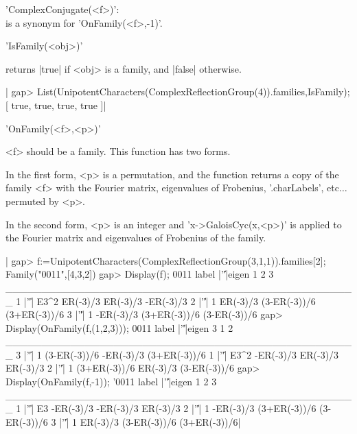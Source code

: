 'ComplexConjugate(<f>)':\\   is    a    synonym    for 'OnFamily(<f>,-1)'.


'IsFamily(<obj>)'

returns |true| if <obj> is a family, and |false| otherwise.

|    gap> List(UnipotentCharacters(ComplexReflectionGroup(4)).families,IsFamily);
    [ true, true, true, true ]|


'OnFamily(<f>,<p>)'

<f> should be a family. This function has two forms.

In the first form, <p> is a permutation, and the function returns a copy of
the   family  <f>  with  the  Fourier  matrix,  eigenvalues  of  Frobenius,
'.charLabels', etc$\ldots$ permuted by <p>.

In  the second form, <p> is an integer and 'x->GaloisCyc(x,<p>)' is applied
to the Fourier matrix and eigenvalues of Frobenius of the family.

|    gap> f:=UnipotentCharacters(ComplexReflectionGroup(3,1,1)).families[2];
    Family("0011",[4,3,2])
    gap> Display(f);
    0011
    label |'\|'|eigen         1            2            3
    _________________________________________________
    1     |'\|'| E3^2  ER(-3)/3     ER(-3)/3    -ER(-3)/3
    2     |'\|'|    1  ER(-3)/3 (3-ER(-3))/6 (3+ER(-3))/6
    3     |'\|'|    1 -ER(-3)/3 (3+ER(-3))/6 (3-ER(-3))/6
    gap> Display(OnFamily(f,(1,2,3)));
    0011
    label |'\|'|eigen            3         1            2
    _________________________________________________
    3     |'\|'|    1 (3-ER(-3))/6 -ER(-3)/3 (3+ER(-3))/6
    1     |'\|'| E3^2    -ER(-3)/3  ER(-3)/3     ER(-3)/3
    2     |'\|'|    1 (3+ER(-3))/6  ER(-3)/3 (3-ER(-3))/6
    gap> Display(OnFamily(f,-1));
    '0011
    label |'\|'|eigen         1            2            3
    _________________________________________________
    1     |'\|'|   E3 -ER(-3)/3    -ER(-3)/3     ER(-3)/3
    2     |'\|'|    1 -ER(-3)/3 (3+ER(-3))/6 (3-ER(-3))/6
    3     |'\|'|    1  ER(-3)/3 (3-ER(-3))/6 (3+ER(-3))/6|


